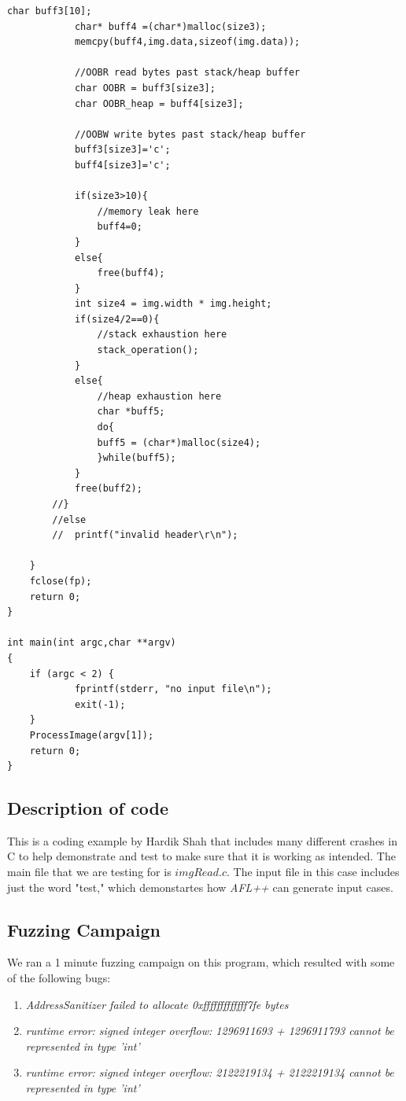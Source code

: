\documentclass[11pt]{article}
\begin{document}
\begin{lstlisting}[style=CStyle]
			char buff3[10];
			char* buff4 =(char*)malloc(size3);
			memcpy(buff4,img.data,sizeof(img.data));

			//OOBR read bytes past stack/heap buffer
			char OOBR = buff3[size3];
			char OOBR_heap = buff4[size3];

			//OOBW write bytes past stack/heap buffer
			buff3[size3]='c';
			buff4[size3]='c';

			if(size3>10){
				//memory leak here
				buff4=0;
			}
			else{
				free(buff4);
			}
			int size4 = img.width * img.height;
			if(size4/2==0){
				//stack exhaustion here
				stack_operation();
			}
			else{
				//heap exhaustion here
				char *buff5;
				do{
				buff5 = (char*)malloc(size4);
				}while(buff5);
			}
			free(buff2);
		//}
		//else
		//	printf("invalid header\r\n");

	}
	fclose(fp);
	return 0;
}

int main(int argc,char **argv)
{
	if (argc < 2) {
    		fprintf(stderr, "no input file\n");
    		exit(-1);
  	}
	ProcessImage(argv[1]);
	return 0;
}
\end{lstlisting}

\subsection{Description of code}
This is a coding example by Hardik Shah that includes many different crashes in C to help demonstrate and test  \textit{} to make sure that it is working as intended. The main file that we are testing for is $imgRead.c$. The input file in this case includes just the word "test," which demonstartes how \textit{AFL++} can generate input cases. 

\subsection{Fuzzing Campaign}
We ran a 1 minute fuzzing campaign on this program, which resulted with some of the following bugs:
\begin{enumerate}
    \item \textit{AddressSanitizer failed to allocate 0xfffffffffffff7fe bytes}
    \item \textit{runtime error: signed integer overflow: 1296911693 + 1296911793 cannot be represented in type 'int'}
    \item \textit{runtime error: signed integer overflow: 2122219134 + 2122219134 cannot be represented in type 'int'}
\end{enumerate}
\end{document}
